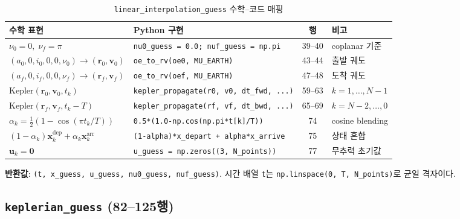 \documentclass[11pt]{article}
\begin{document}
\begin{table}[htbp]
\centering
\caption{\texttt{linear\_interpolation\_guess} 수학--코드 매핑}
\label{tab:linear_interp_mapping}
\small
\begin{tabular}{@{}llcl@{}}
\toprule
수학 표현 & Python 구현 & 행 & 비고 \\
\midrule
$\nu_0 = 0,\; \nu_f = \pi$ & \texttt{nu0\_guess = 0.0; nuf\_guess = np.pi} & 39--40 & coplanar 기준 \\
$(a_0, 0, i_0, 0, 0, \nu_0) \to (\mathbf{r}_0, \mathbf{v}_0)$ & \texttt{oe\_to\_rv(oe0, MU\_EARTH)} & 43--44 & 출발 궤도 \\
$(a_f, 0, i_f, 0, 0, \nu_f) \to (\mathbf{r}_f, \mathbf{v}_f)$ & \texttt{oe\_to\_rv(oef, MU\_EARTH)} & 47--48 & 도착 궤도 \\
$\text{Kepler}(\mathbf{r}_0, \mathbf{v}_0, t_k)$ & \texttt{kepler\_propagate(r0, v0, dt\_fwd, ...)} & 59--63 & $k=1,\ldots,N{-}1$ \\
$\text{Kepler}(\mathbf{r}_f, \mathbf{v}_f, t_k{-}T)$ & \texttt{kepler\_propagate(rf, vf, dt\_bwd, ...)} & 65--69 & $k=N{-}2,\ldots,0$ \\
$\alpha_k = \tfrac{1}{2}(1 - \cos(\pi t_k/T))$ & \texttt{0.5*(1.0-np.cos(np.pi*t[k]/T))} & 74 & cosine blending \\
$(1{-}\alpha_k)\mathbf{x}_k^{\text{dep}} + \alpha_k \mathbf{x}_k^{\text{arr}}$ & \texttt{(1-alpha)*x\_depart + alpha*x\_arrive} & 75 & 상태 혼합 \\
$\mathbf{u}_k = \mathbf{0}$ & \texttt{u\_guess = np.zeros((3, N\_points))} & 77 & 무추력 초기값 \\
\bottomrule
\end{tabular}
\end{table}

\textbf{반환값}: \texttt{(t, x\_guess, u\_guess, nu0\_guess, nuf\_guess)}.
시간 배열 \texttt{t}는 \texttt{np.linspace(0, T, N\_points)}로 균일 격자이다.


\subsection{\texttt{keplerian\_guess} (82--125행)}
\label{sec:impl_keplerian}
\end{document}
